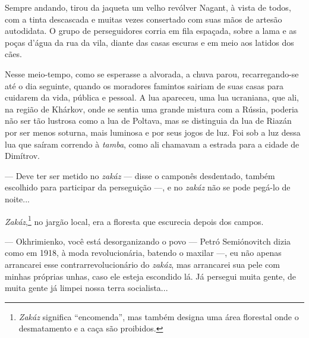 Sempre andando, tirou da jaqueta um velho revólver Nagant, à vista de
todos, com a tinta descascada e muitas vezes consertado com suas mãos de
artesão autodidata. O grupo de perseguidores corria em fila espaçada,
sobre a lama e as poças d'água da rua da vila, diante das casas escuras
e em meio aos latidos dos cães.

Nesse meio-tempo, como se esperasse a alvorada, a chuva parou,
recarregando-se até o dia seguinte, quando os moradores famintos sairiam
de suas casas para cuidarem da vida, pública e pessoal. A lua apareceu,
uma lua ucraniana, que ali, na região de Khárkov, onde se sentia uma
grande mistura com a Rússia, poderia não ser tão lustrosa como a lua de
Poltava, mas se distinguia da lua de Riazán por ser menos soturna, mais
luminosa e por seus jogos de luz. Foi sob a luz dessa lua que saíram
correndo à \emph{tamba}, como ali chamavam a estrada para a cidade de
Dimítrov.

--- Deve ter ser metido no \emph{zakáz} --- disse o camponês desdentado,
também escolhido para participar da perseguição ---, e no \emph{zakáz}
não se pode pegá-lo de noite...

\emph{Zakáz},\footnote{\emph{Zakáz} significa ``encomenda'', mas também
  designa uma área florestal onde o desmatamento e a caça são proibidos.}
no jargão local, era a floresta que escurecia depois dos campos.

--- Okhrimienko, você está desorganizando o povo --- Petró Semiónovitch
dizia como em 1918, à moda revolucionária, batendo o maxilar ---, eu não
apenas arrancarei esse contrarrevolucionário do \emph{zakáz}, mas
arrancarei sua pele com minhas próprias unhas, caso ele esteja escondido
lá. Já persegui muita gente, de muita gente já limpei nossa terra
socialista...

